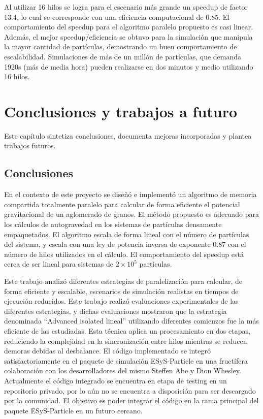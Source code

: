 \documentclass[a4paper,11pt]{book}
\begin{document}
Al utilizar 16 hilos se logra para el escenario más grande un speedup de factor 13.4, lo cual se corresponde con una eficiencia computacional de 0.85. El comportamiento del speedup para el algoritmo paralelo propuesto es casi linear. Además, el mejor speedup/eficiencia se obtuvo para la simulación que manipula la mayor cantidad de partículas, demostrando un buen comportamiento de escalabilidad. Simulaciones de más de un millón de partículas, que demanda 1920s (más de media hora) pueden realizarse en dos minutos y medio utilizando 16 hilos.

\chapter{Conclusiones y trabajos a futuro}

Este capítulo sintetiza conclusiones, documenta mejoras incorporadas y plantea trabajos futuros.

\section{Conclusiones}
En el contexto de este proyecto se diseñó e implementó un algoritmo de memoria compartida totalmente paralelo para calcular de forma eficiente el potencial gravitacional de un aglomerado de granos. El método propuesto es adecuado para los cálculos de autogravedad en los sistemas de partículas densamente empaquetados.
El algoritmo escala de forma lineal con el número de partículas del sistema, y escala con una ley de potencia inversa de exponente 0.87 con el número de hilos utilizados en el cálculo. El comportamiento del speedup está cerca de ser lineal para sistemas de $2 \times 10^5$ partículas.

Este trabajo analizó diferentes estrategias de paralelización para calcular, de forma eficiente y escalable, escenarios de simulación realistas en tiempos de ejecución reducidos. Este trabajo realizó evaluaciones experimentales de las diferentes estrategias, y dichas evaluaciones mostraron que la estrategia denominada “Advanced isolated lineal” utilizando diferentes comienzos fue la más eficiente de las estudiadas. Esta técnica aplica un procesamiento en dos etapas, reduciendo la complejidad en la sincronización entre hilos mientras se reducen demoras debidas al desbalance.
El código implementado se integró satisfactoriamente en el paquete de simulación ESyS-Particle en una fructífera colaboración con los desarrolladores del mismo Steffen Abe y Dion Whesley. Actualmente el código integrado se encuentra en etapa de testing en un repositorio privado, por lo  aún no se encuentra a disposición para ser descargado por la comunidad.
El objetivo es poder integrar el código en la rama principal del paquete ESyS-Particle en un futuro cercano.
\end{document}
